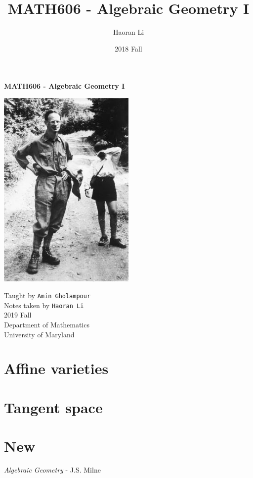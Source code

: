\documentclass[a4paper,10pt]{article}
\title{MATH606 - Algebraic Geometry I}
\author{Haoran Li}
\date{2018 Fall}
\begin{document}
\sloppy %

\begin{titlepage}
\begin{center}
\vspace*{1cm}
\LARGE
\textbf{MATH606 - Algebraic Geometry I} \\
\vspace{2cm}
\begin{center}
\includegraphics[width=0.5\textwidth]{Pictures/Weil.jpg}
\end{center}
\vspace{2cm}
\normalsize
Taught by \texttt{Amin Gholampour} \\
Notes taken by \texttt{Haoran Li} \\
2019 Fall \\
\vspace{2cm}
Department of Mathematics\\
University of Maryland\\
\end{center}
\end{titlepage}

\tableofcontents
\newpage

\section{Affine varieties}


\section{Tangent space}


\section{New}


\newpage

\begin{thebibliography}{}

\textit{Algebraic Geometry} - J.S. Milne

\end{thebibliography}

\printindex
\newpage
\end{document}
